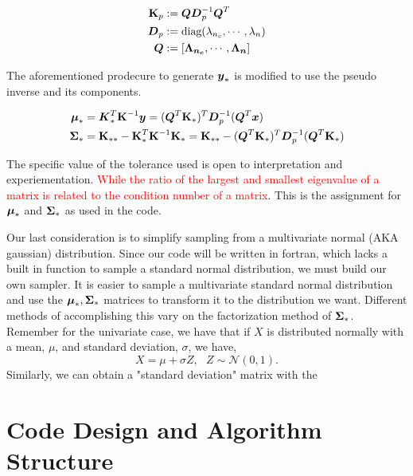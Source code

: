 \documentclass{article}
\begin{document}
\begin{align*}
    \boldsymbol{\mathrm{K}}_p &:= \boldsymbol{Q} \boldsymbol{D}_p^{-1} \boldsymbol{Q}^{T} \\
    \boldsymbol{D}_p &:= \text{diag}(\lambda_{n_c}, \cdots, \lambda_{n}) \\  
    \boldsymbol{Q} &:= \left[\boldsymbol{\Lambda_{n_c}}, \cdots, \boldsymbol{\Lambda_{n}}\right]   
   \end{align*}
\emp

The aforementioned prodecure to generate $\boldsymbol{y}_*$ is modified to use the pseudo inverse and its components. 

\begin{align*}
    \boldsymbol{\mu}_*  &=  \boldsymbol{K}_*^T\boldsymbol{\mathrm{K}}^{-1}\boldsymbol{y}  
                = (\boldsymbol{Q}^T\boldsymbol{\mathrm{K}}_*)^T\boldsymbol{D}_p^{-1}(\boldsymbol{Q}^T\boldsymbol{x}) \\
    \boldsymbol{\Sigma}_* &= \boldsymbol{\mathrm{K}}_{**} - \boldsymbol{\mathrm{K}}_*^T\boldsymbol{\mathrm{K}}^{-1}\boldsymbol{\mathrm{K}}_* 
                = \boldsymbol{\mathrm{K}}_{**} - (\boldsymbol{Q}^T\boldsymbol{\mathrm{K}}_*)^T\boldsymbol{D}_p^{-1}(\boldsymbol{Q}^T\boldsymbol{\mathrm{K}}_*) 
\end{align*}
\emp

The specific value of the tolerance used is open to interpretation and experiementation. \textcolor{red}{While the ratio of the largest and smallest eigenvalue of a matrix is related to the condition number of a matrix}. This is the assignment for $\boldsymbol{\mu}_*$ and $\boldsymbol{\Sigma}_*$ as used in the code. 

Our last consideration is to simplify sampling from a multivariate normal (AKA gaussian) distribution. Since our code will be written in fortran, which lacks a built in function to sample a standard normal distribution, we must build our own sampler. It is easier to sample a multivariate standard normal distribution and use the $\boldsymbol{\mu}_*, \boldsymbol{\Sigma}_*$ matrices to transform it to the distribution we want. Different methods of accomplishing this vary on the factorization method of $\boldsymbol{\Sigma}_*$. Remember for the univariate case, we have that if $X$ is distributed normally with a mean, $\mu$, and standard deviation, $\sigma$, we have, 
\[X = \mu + \sigma Z, \text{  } Z \sim \mathcal{N}(0, 1).\]
Similarly, we can obtain a "standard deviation" matrix with the 



\section{Code Design and Algorithm Structure}
\end{document}
